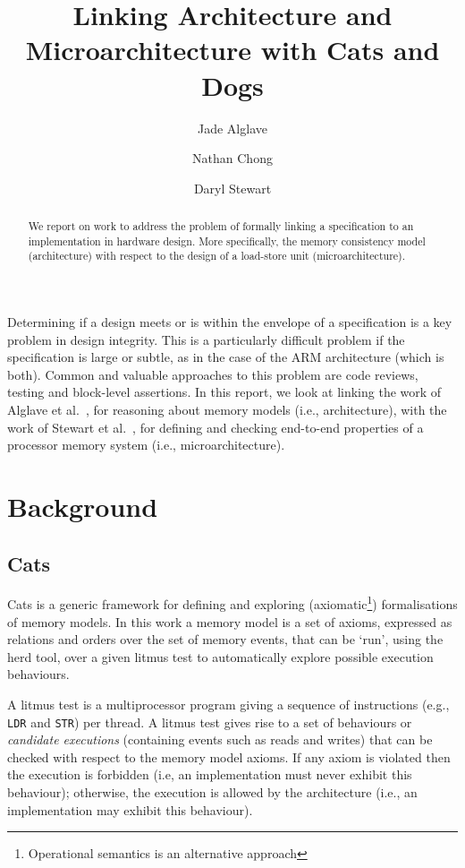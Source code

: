 \documentclass[10pt]{paper}
\begin{document}
\title{Linking Architecture and Microarchitecture with Cats and Dogs}
\author{Jade Alglave\and Nathan Chong\and Daryl Stewart}
\maketitle

\begin{abstract}
We report on work to address the problem of formally linking a specification to an implementation in hardware design.
%
More specifically, the memory consistency model (architecture) with respect to the design of a load-store unit (microarchitecture).
\end{abstract}

Determining if a design meets or is within the envelope of a specification is a key problem in design integrity.
%
This is a particularly difficult problem if the specification is large or subtle, as in the case of the ARM architecture (which is both).
%
Common and valuable approaches to this problem are code reviews, testing and block-level assertions.
%
In this report, we look at linking the work of Alglave et al.~\cite{}, for reasoning about memory models (i.e., architecture), with the work of Stewart et al.~\cite{}, for defining and checking end-to-end properties of a processor memory system (i.e., microarchitecture).

\section{Background}

\subsection{Cats}

Cats is a generic framework for defining and exploring (axiomatic\footnote{Operational semantics is an alternative approach}) formalisations of memory models.
%
In this work a memory model is a set of axioms, expressed as relations and orders over the set of memory events, that can be `run', using the herd tool, over a given litmus test to automatically explore possible execution behaviours.

A litmus test is a multiprocessor program giving a sequence of instructions (e.g., \texttt{LDR} and \texttt{STR}) per thread.
%
A litmus test gives rise to a set of behaviours or \emph{candidate executions} (containing events such as reads and writes) that can be checked with respect to the memory model axioms.
%
If any axiom is violated then the execution is forbidden (i.e, an implementation must never exhibit this behaviour); otherwise, the execution is allowed by the architecture (i.e., an implementation may exhibit this behaviour).
\end{document}
